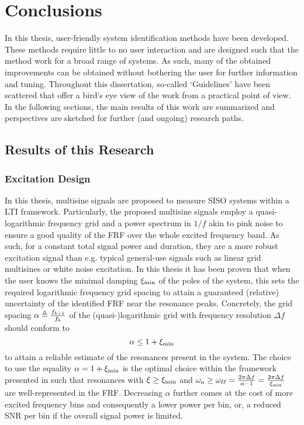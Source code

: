 \chapter{Conclusions}

In this thesis, user-friendly system identification methods have been developed.
These methods require little to no user interaction and are designed such that the method work for a broad range of systems.
As such, many of the obtained improvements can be obtained without bothering the user for further information and tuning.
Throughout this dissertation, so-called `Guidelines' have been scattered that offer a bird's eye view of the work from a practical point of view.
In the following sections, the main results of this work are summarized and perspectives are sketched for further (and ongoing) research paths.

\section{Results of this Research}

  \subsection{Excitation Design}
  In this thesis, multisine signals are proposed to measure \gls{SISO} systems within a \gls{LTI} framework.
  Particularly, the proposed multisine signals employ a quasi-logarithmic frequency grid and a power spectrum in $1/f$ akin to pink noise to ensure a good quality of the \gls{FRF} over the whole excited frequency band.
  As such, for a constant total signal power and duration, they are a more robust excitation signal than e.g. typical general-use signals such as linear grid multisines or white noise excitation.
  In this thesis it has been proven that when the user knows the minimal damping $\damping[\min]$ of the poles of the system, this sets the required logarithmic frequency grid spacing to attain a guaranteed (relative) uncertainty of the identified \gls{FRF} near the resonance peaks.
  Concretely, the grid spacing $\alpha \isdef \frac{f_{k+1}}{f_k}$ of the (quasi-)logarithmic grid with frequency resolution $\Delta f$ should conform to
  \begin{equation}
    \alpha \leq 1 + \damping[\min]
  \end{equation}
  to attain a reliable estimate of the resonances present in the system.
  The choice to use the equality $\alpha = 1+ \damping[\min]$ is the optimal choice within the framework presented in  such that resonances with $\damping \geq \damping[\min]$ and $\wn \geq \omegaLinLog = \frac{2 \pi \Delta f}{\alpha-1} = \frac{2 \pi \Delta f}{\damping[\min]}$ are well-represented in the \gls{FRF}.
  Decreasing $ \alpha$ further comes at the cost of more excited frequency bins and consequently a lower power per bin, or, a reduced \gls{SNR} per bin if the overall signal power is limited.

